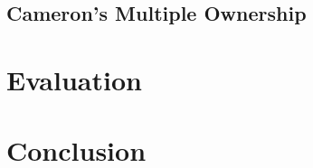 \documentclass{acm_proc_article-sp}
\begin{document}
\subsection{Cameron's Multiple Ownership}
\label{subsec:cameron}

%
%
%

\lipsum[10]



\section{Evaluation}
\label{sec:eval}

\lipsum[11]




\section{Conclusion}
\label{sec:conclude}





\lipsum[12]
\end{document}
